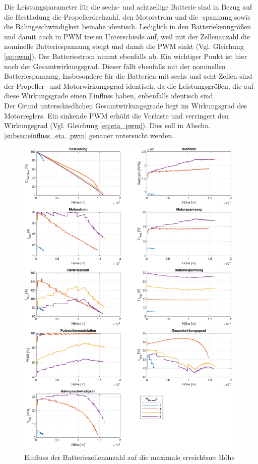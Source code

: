 Die Leistungsparameter für die sechs- und achtzellige Batterie sind in Bezug auf die Restladung die Propellerdrehzahl, den Motorstrom und die -spannung sowie die Bahngeschwindigkeit beinahe identisch. Lediglich in den Batteriekenngrößen und damit auch in PWM treten Unterschiede auf, weil mit der Zellenanzahl die nominelle Batteriespannung steigt und damit die PWM sinkt (Vgl. Gleichung \ref{eq:pwm}). Der Batteriestrom nimmt ebenfalls ab. 
Ein wichtiger Punkt ist hier noch der Gesamtwirkungsgrad. Dieser fällt ebenfalls mit der nominellen Batteriespannung. Insbesondere für die Batterien mit sechs und acht Zellen sind der Propeller- und Motorwirkungsgrad identisch, da die Leistungsgrößen, die auf diese Wirkungsgrade einen Einfluss haben, enbenfalls identisch sind. \\
Der Grund unterschiedlichen Gesamtwirkungsgrade liegt im Wirkungsgrad des Motorreglers. Ein sinkende PWM erhöht die Verluste und verringert den Wirkungsgrad (Vgl. Gleichung \ref{eq:eta_pwm}). Dies soll in Abschn. \ref{subsec:einfluss_eta_pwm} genauer untersucht werden.


\begin{figure}[H]
\centering
	\includegraphics[scale=0.70]{Diagramme/Untersuchung_N_Bat.pdf}
	\caption{Einfluss der Batteriezellenanzahl auf die maximale erreichbare Höhe}
	\label{abb:N_Bat_einfluss}
\end{figure}

